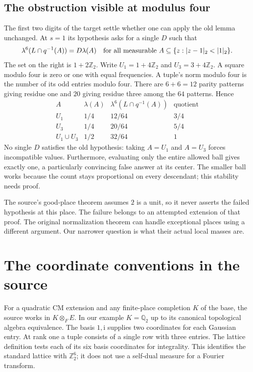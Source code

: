 \documentclass[12pt,letterpaper]{article}
\begin{document}
\clearpage\subsection{The obstruction visible at modulus four}
The first two digits of the target settle whether one can apply the old lemma unchanged. At \(s=1\) its hypothesis asks for a single \(D\) such that
\[
  \lambda^6(L\cap q^{-1}(A))=D\lambda(A)
    \quad\hbox{for all measurable } A\subseteq
       \{z:|z-1|_2<|1|_2\}.
\]
The set on the right is \(1+2\mathbb Z_2\). Write \(U_1=1+4\mathbb Z_2\) and \(U_3=3+4\mathbb Z_2\). A square modulo four is zero or one with equal frequencies. A tuple's norm modulo four is the number of its odd entries modulo four. There are \(6+6=12\) parity patterns giving residue one and \(20\) giving residue three among the \(64\) patterns. Hence
\[
 \begin{array}{c|ccc}
 A & \lambda(A)&\lambda^6(L\cap q^{-1}(A))&\text{quotient}\\\hline
 U_1&1/4&12/64&3/4\\
 U_3&1/4&20/64&5/4\\
 U_1\cup U_3&1/2&32/64&1
 \end{array}
\]
No single \(D\) satisfies the old hypothesis: taking \(A=U_1\) and \(A=U_3\) forces incompatible values. Furthermore, evaluating only the entire allowed ball gives exactly one, a particularly convincing false answer at its center. The smaller ball works because the count stays proportional on every descendant; this stability needs proof.

The source's good-place theorem assumes \(2\) is a unit, so it never asserts the failed hypothesis at this place. The failure belongs to an attempted extension of that proof. The original normalization theorem can handle exceptional places using a different argument. Our narrower question is what their actual local masses are.

\clearpage\section{The coordinate conventions in the source}
For a quadratic CM extension and any finite-place completion \(K\) of the base, the source works in \(K\otimes_F E\). In our example \(K=\mathbb Q_2\) up to its canonical topological algebra equivalence. The basis \(1,\mathrm i\) supplies two coordinates for each Gaussian entry. At rank one a tuple consists of a single row with three entries. The lattice definition tests each of its six basis coordinates for integrality. This identifies the standard lattice with \(\mathbb Z_2^6\); it does not use a self-dual measure for a Fourier transform.
\end{document}
